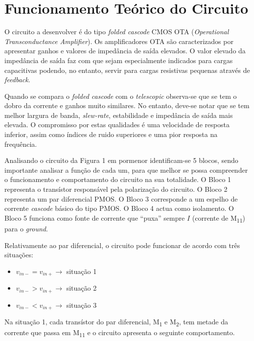 \documentclass[11pt]{article}
\numberwithin{equation}{section}
\begin{document}
\pagebreak

\section{Funcionamento Teórico do Circuito}

O circuito a desenvolver é do tipo \textit{folded cascode} CMOS OTA (\textit{Operational Transconductance Amplifier}). Os amplificadores OTA são caracterizados por apresentar ganhos e valores de impedância de saída elevados. O valor elevado da impedância de saída  faz com que sejam especialmente indicados para cargas capacitivas podendo, no entanto, servir para cargas resistivas pequenas através de \textit{feedback}.

Quando se compara o \textit{folded cascode} com o \textit{telescopic} observa-se que se tem o dobro da corrente e ganhos muito similares. No entanto, deve-se notar que se tem melhor largura de banda, \textit{slew-rate}, estabilidade e impedância de saída mais elevada. O compromisso por estas qualidades é uma velocidade de resposta inferior, assim como índices de ruido superiores e uma pior resposta na frequência.

Analisando o circuito da Figura 1 em pormenor identificam-se 5 blocos, sendo importante analisar a função de cada um, para que melhor se possa compreender o funcionamento e comportamento do circuito na sua totalidade. O Bloco 1 representa o transístor responsável pela polarização do circuito. O Bloco 2 representa um par diferencial PMOS. O Bloco 3 corresponde a um espelho de corrente \textit{cascode} básico do tipo PMOS. O Bloco 4 actua como isolamento. O Bloco 5 funciona como fonte de corrente que ``puxa'' sempre $I$ (corrente de M\textsubscript{11}) para o \textit{ground}.

Relativamente ao par diferencial, o circuito pode funcionar de acordo com três situações:

\begin{itemize}
	\vspace{-3mm}
	\item $v_{in-} = v_{in+} \rightarrow$ situação 1
	\vspace{-1.5mm}
	\item $v_{in-} > v_{in+} \rightarrow$ situação 2
	\vspace{-1.5mm}
	\item $v_{in-} < v_{in+} \rightarrow$ situação 3
\end{itemize}

Na situação 1, cada transístor do par diferencial, M\textsubscript{1} e M\textsubscript{2}, tem metade da corrente que passa em M\textsubscript{11} e o circuito apresenta o seguinte comportamento.
\end{document}
